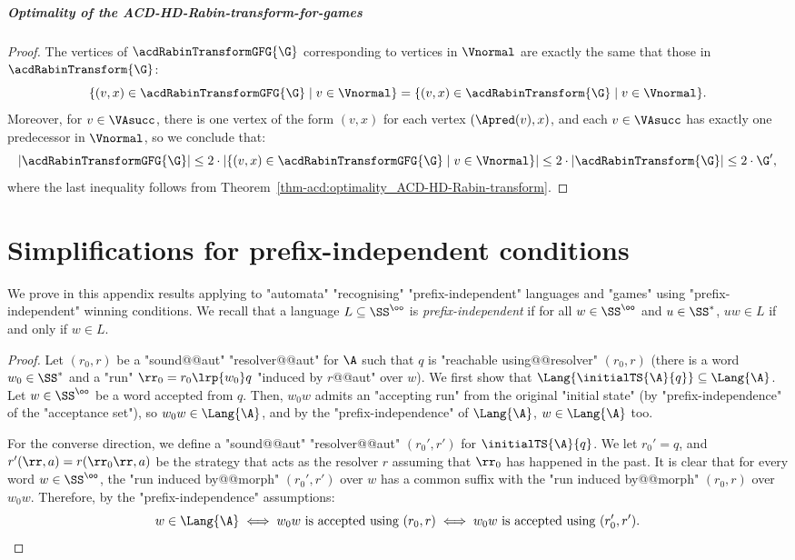 \documentclass{theoretics}
\begin{document}
\subparagraph*{Optimality of the ACD-HD-Rabin-transform-for-games}
\optimalityAcdRabinTransformGames*
\begin{proof}
	The vertices of $\acdRabinTransformGFG{\G}$ corresponding to vertices in $\Vnormal$ are exactly the same that those in $\acdRabinTransform{\G}$: 
	\[ \{(v,x)\in \acdRabinTransformGFG{\G} \mid v\in \Vnormal\} = \{(v,x)\in \acdRabinTransform{\G} \mid v\in \Vnormal\}. \]
	Moreover, for $v\in\VAsucc$, there is one vertex of the form $(v,x)$ for each vertex $(\Apred(v),x)$, and each $v\in\VAsucc$ has exactly one predecessor in $\Vnormal$, so we conclude that:
	\[ |\acdRabinTransformGFG{\G}| \leq 2\cdot |\{(v,x)\in \acdRabinTransformGFG{\G} \mid v\in \Vnormal\}| \leq 2\cdot|\acdRabinTransform{\G}| \leq 2\cdot\G', \]
	where the last inequality follows from Theorem~\ref{thm-acd:optimality_ACD-HD-Rabin-transform}.
\end{proof} 	
	\section{Simplifications for prefix-independent conditions}
	\label{sec:appendix-prefix-independent}

We prove in this appendix results applying to "automata" "recognising" "prefix-independent" languages and "games" using "prefix-independent" winning conditions. We recall that a language $L\subseteq \SS^\oo$ is \emph{prefix-independent} if for all $w\in \SS^\oo$ and $u\in \SS^*$,  $uw\in L$ if and only if $w\in L$.


\prefixIndepAutomaton*
\begin{proof}
	Let $(r_0, r)$ be a "sound@@aut" "resolver@@aut" for $\A$ such that $q$ is "reachable using@@resolver" $(r_0, r)$ (there is a word $w_0\in \SS^*$ and a "run" $\rr_0 = r_0 \lrp{w_0} q$ "induced by $r$@@aut" over $w$). 
	We first show that  $\Lang{\initialTS{\A}{q}} \subseteq \Lang{\A}$. Let $w\in \SS^\oo$ be a word accepted from $q$. Then, $w_0w$ admits an "accepting run" from the original "initial state" (by "prefix-independence" of the "acceptance set"), so $w_0w\in \Lang{\A}$, and by the "prefix-independence" of $\Lang{\A}$, $w\in \Lang{\A}$ too.
		
	For the converse direction, we define a "sound@@aut" "resolver@@aut" $(r_0', r')$ for $\initialTS{\A}{q}$. We let $r_0' = q$, and $r'(\rr,a) = r(\rr_0\rr,a)$ be the strategy that acts as the resolver $r$ assuming that $\rr_0$ has happened in the past. It is clear that for every word $w\in \SS^\oo$, the "run induced by@@morph" $(r_0', r')$ over $w$ has a common suffix with the "run induced by@@morph" $(r_0, r)$ over $w_0w$. Therefore, by the "prefix-independence" assumptions:
	\[ w\in \Lang{\A} \iff w_0w \text{ is accepted using } (r_0, r) \iff w_0w \text{ is accepted using }(r_0', r').\qedhere \]
\end{proof}
\end{document}
